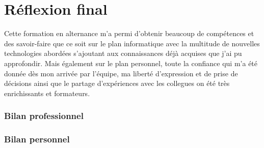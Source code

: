\section{Réflexion final}
Cette formation en alternance m'a permi d'obtenir beaucoup de compétences et des
savoir-faire que ce soit sur le plan informatique avec la multitude de nouvelles
technologies abordées s'ajoutant aux connaissances déjà acquises que j'ai pu
approfondir. Mais également sur le plan personnel, toute la confiance qui m'a
été donnée dès mon arrivée par l'équipe, ma liberté d'expression et de prise de
décisions ainsi que le partage d'expériences avec les collegues on été très
enrichissants et formateurs.

\subsubsection{Bilan professionnel}

\subsubsection{Bilan personnel}
